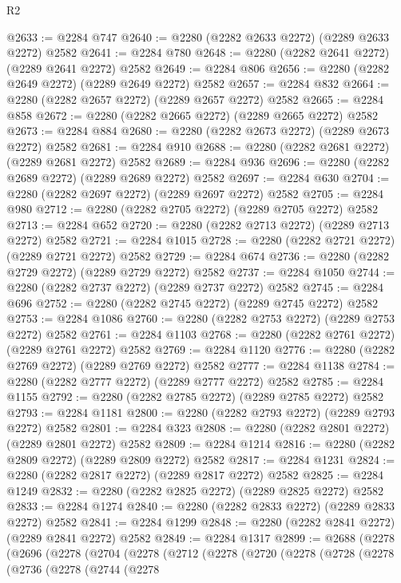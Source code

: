 \begin{lexlean}{R2}
\begin{coremodule}
@2633 := @2284 @747
@2640 := @2280 (@2282 @2633 @2272) (@2289 @2633 @2272) @2582
@2641 := @2284 @780
@2648 := @2280 (@2282 @2641 @2272) (@2289 @2641 @2272) @2582
@2649 := @2284 @806
@2656 := @2280 (@2282 @2649 @2272) (@2289 @2649 @2272) @2582
@2657 := @2284 @832
@2664 := @2280 (@2282 @2657 @2272) (@2289 @2657 @2272) @2582
@2665 := @2284 @858
@2672 := @2280 (@2282 @2665 @2272) (@2289 @2665 @2272) @2582
@2673 := @2284 @884
@2680 := @2280 (@2282 @2673 @2272) (@2289 @2673 @2272) @2582
@2681 := @2284 @910
@2688 := @2280 (@2282 @2681 @2272) (@2289 @2681 @2272) @2582
@2689 := @2284 @936
@2696 := @2280 (@2282 @2689 @2272) (@2289 @2689 @2272) @2582
@2697 := @2284 @630
@2704 := @2280 (@2282 @2697 @2272) (@2289 @2697 @2272) @2582
@2705 := @2284 @980
@2712 := @2280 (@2282 @2705 @2272) (@2289 @2705 @2272) @2582
@2713 := @2284 @652
@2720 := @2280 (@2282 @2713 @2272) (@2289 @2713 @2272) @2582
@2721 := @2284 @1015
@2728 := @2280 (@2282 @2721 @2272) (@2289 @2721 @2272) @2582
@2729 := @2284 @674
@2736 := @2280 (@2282 @2729 @2272) (@2289 @2729 @2272) @2582
@2737 := @2284 @1050
@2744 := @2280 (@2282 @2737 @2272) (@2289 @2737 @2272) @2582
@2745 := @2284 @696
@2752 := @2280 (@2282 @2745 @2272) (@2289 @2745 @2272) @2582
@2753 := @2284 @1086
@2760 := @2280 (@2282 @2753 @2272) (@2289 @2753 @2272) @2582
@2761 := @2284 @1103
@2768 := @2280 (@2282 @2761 @2272) (@2289 @2761 @2272) @2582
@2769 := @2284 @1120
@2776 := @2280 (@2282 @2769 @2272) (@2289 @2769 @2272) @2582
@2777 := @2284 @1138
@2784 := @2280 (@2282 @2777 @2272) (@2289 @2777 @2272) @2582
@2785 := @2284 @1155
@2792 := @2280 (@2282 @2785 @2272) (@2289 @2785 @2272) @2582
@2793 := @2284 @1181
@2800 := @2280 (@2282 @2793 @2272) (@2289 @2793 @2272) @2582
@2801 := @2284 @323
@2808 := @2280 (@2282 @2801 @2272) (@2289 @2801 @2272) @2582
@2809 := @2284 @1214
@2816 := @2280 (@2282 @2809 @2272) (@2289 @2809 @2272) @2582
@2817 := @2284 @1231
@2824 := @2280 (@2282 @2817 @2272) (@2289 @2817 @2272) @2582
@2825 := @2284 @1249
@2832 := @2280 (@2282 @2825 @2272) (@2289 @2825 @2272) @2582
@2833 := @2284 @1274
@2840 := @2280 (@2282 @2833 @2272) (@2289 @2833 @2272) @2582
@2841 := @2284 @1299
@2848 := @2280 (@2282 @2841 @2272) (@2289 @2841 @2272) @2582
@2849 := @2284 @1317
@2899 := @2688
    (@2278
      (@2696
        (@2278
          (@2704
            (@2278
              (@2712
                (@2278
                  (@2720
                    (@2278
                      (@2728
                        (@2278
                          (@2736
                            (@2278
                              (@2744
                                (@2278

\end{coremodule}
\end{lexlean}
